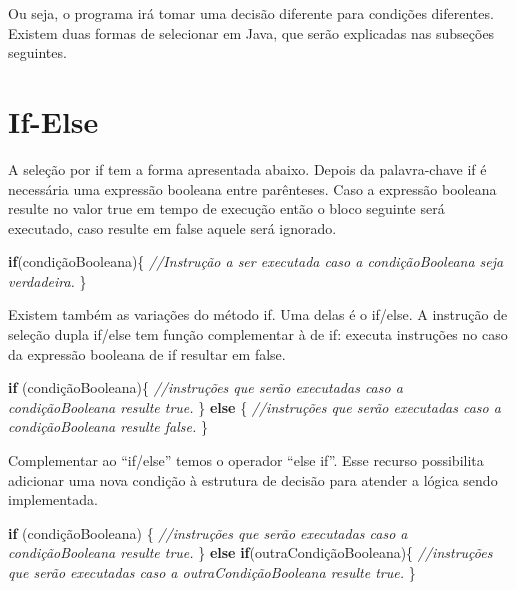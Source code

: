 \documentclass[
]{book}
\newenvironment{Shaded}{\begin{snugshade}}{\end{snugshade}}
\newcommand{\CommentTok}[1]{\textcolor[rgb]{0.56,0.35,0.01}{\textit{#1}}}
\newcommand{\KeywordTok}[1]{\textcolor[rgb]{0.13,0.29,0.53}{\textbf{#1}}}
\newcommand{\NormalTok}[1]{#1}
\begin{document}
Ou seja, o programa irá tomar uma decisão diferente para condições diferentes. Existem duas formas de selecionar em Java, que serão explicadas nas subseções seguintes.

\hypertarget{if-else}{%
\section{If-Else}\label{if-else}}

A seleção por if tem a forma apresentada abaixo. Depois da palavra-chave if é necessária uma expressão booleana entre parênteses. Caso a expressão booleana resulte no valor true em tempo de execução então o bloco seguinte será executado, caso resulte em false aquele será ignorado.

\begin{Shaded}
\begin{Highlighting}[]
\KeywordTok{if}\NormalTok{(condiçãoBooleana)\{}
  \CommentTok{//Instrução a ser executada caso a condiçãoBooleana seja verdadeira.}
\NormalTok{\}}
\end{Highlighting}
\end{Shaded}

Existem também as variações do método if. Uma delas é o if/else. A instrução de seleção dupla if/else tem função complementar à de if: executa instruções no caso da expressão booleana de if resultar em false.

\begin{Shaded}
\begin{Highlighting}[]
\KeywordTok{if}\NormalTok{ (condiçãoBooleana)\{}
  \CommentTok{//instruções que serão executadas caso a condiçãoBooleana resulte true.}
\NormalTok{\} }\KeywordTok{else}\NormalTok{ \{}
  \CommentTok{//instruções que serão executadas caso a condiçãoBooleana resulte false.}
\NormalTok{\}}
\end{Highlighting}
\end{Shaded}

Complementar ao ``if/else'' temos o operador ``else if''. Esse recurso possibilita adicionar uma nova condição à estrutura de decisão para atender a lógica sendo implementada.

\begin{Shaded}
\begin{Highlighting}[]
\KeywordTok{if}\NormalTok{ (condiçãoBooleana) \{}
    \CommentTok{//instruções que serão executadas caso a condiçãoBooleana resulte true.}
\NormalTok{\} }\KeywordTok{else} \KeywordTok{if}\NormalTok{(outraCondiçãoBooleana)\{}
    \CommentTok{//instruções que serão executadas caso a outraCondiçãoBooleana resulte true.}
\NormalTok{\}}
\end{Highlighting}
\end{Shaded}
\end{document}
